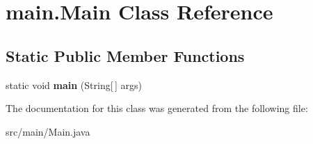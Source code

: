 \hypertarget{classmain_1_1_main}{}\section{main.\+Main Class Reference}
\label{classmain_1_1_main}
\subsection*{Static Public Member Functions}
\begin{DoxyCompactItemize}
\item 
\mbox{\label{classmain_1_1_main_a896f71a651b705304693dbfe0cf9ca63}} 
static void {\bfseries main} (String\mbox{[}$\,$\mbox{]} args)
\end{DoxyCompactItemize}


The documentation for this class was generated from the following file\+:\begin{DoxyCompactItemize}
\item 
src/main/Main.\+java\end{DoxyCompactItemize}

